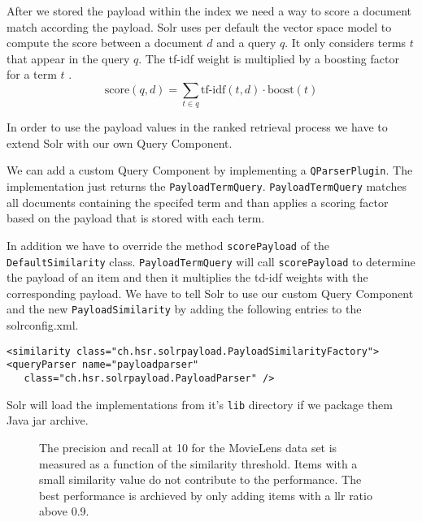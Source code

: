 After we stored the payload within the index we need a way to score a document match according the payload.
Solr uses per default the vector space model to compute the score between a document $d$ and a query $q$. It only considers terms $t$ that appear in the query $q$. The tf-idf weight is multiplied by a boosting factor for a term $t$ \cite{grainger}.  
\begin{equation}
\label{eq:solrsim}
\text{score}(q,d) = \sum_{t \in q} \text{tf-idf}(t,d) \cdot \text{boost}(t)
\end{equation}

In order to use the payload values in the ranked retrieval process we have to extend Solr with our own Query Component. 

We can add a custom Query Component by implementing a \verb|QParserPlugin|. The implementation just returns the \verb|PayloadTermQuery|. \verb|PayloadTermQuery| matches all documents containing the specifed term and than applies a scoring factor based on the payload that is stored with each term.

In addition we have to override the method \verb|scorePayload| of the \\ \verb|DefaultSimilarity| class. \verb|PayloadTermQuery| will call \verb|scorePayload| to determine the payload of an item and then it multiplies the td-idf weights with the corresponding payload. We have to tell Solr to use our custom Query Component and the new \verb|PayloadSimilarity| by adding the following entries to the solrconfig.xml.

\begin{lstlisting}
<similarity class="ch.hsr.solrpayload.PayloadSimilarityFactory">
<queryParser name="payloadparser" 
   class="ch.hsr.solrpayload.PayloadParser" />
\end{lstlisting}
  
Solr will load the implementations from it's \verb|lib| directory if we package them Java jar archive.

\begin{figure}
  \centering
{}
\caption{The precision and recall at 10 for the MovieLens data set is measured as a function of the similarity threshold. Items with a small similarity value do not contribute to the performance. The best performance is archieved by only adding items with a \gls{llr} ratio above 0.9.}
\label{fig:threshold}
\end{figure}

